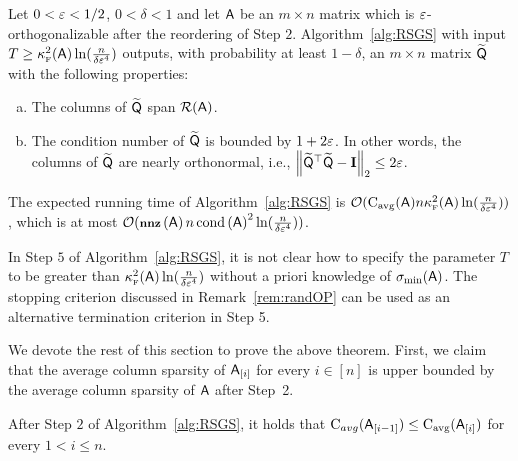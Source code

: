 %
%
%
\begin{theorem}
%
Let $0<\varepsilon< 1/2$, $0<\delta <1$ and let ${\mathsf{A} }$ be an $m\times n$ matrix which is $\varepsilon$-orthogonalizable after the reordering of Step $2$. Algorithm~\ref{alg:RSGS} with input $T\geq \kappa^2_{\textrm{\tiny F}}({\mathsf{A} }) \ln( \frac{n}{\delta\varepsilon^4})$ outputs, with probability at least $1-\delta$, an $m\times n$ matrix $\widetilde{{\mathsf{Q} }}$ with the following properties:
\begin{enumerate}[(a)]
	\item
	The columns of $\widetilde{{\mathsf{Q} }}$ span $\mathcal{R}({\mathsf{A} })$.
	\item
	The condition number of $\widetilde{{\mathsf{Q} }}$ is bounded by $1+2\varepsilon$. In other words, the columns of $\widetilde{{\mathsf{Q} }}$ are nearly orthonormal, i.e., $\left\|\widetilde{{\mathsf{Q} }}^\top \widetilde{{\mathsf{Q} }} - \mathbf{I}\right\|_2 \leq 2\varepsilon$.
\end{enumerate}
The expected running time of Algorithm~\ref{alg:RSGS} is $\mathcal{O}(\mathrm{C}_{\mathrm{avg}}({\mathsf{A} }) n \kappa^2_{\textrm{\tiny F}}({\mathsf{A} }) \ln(\frac{n}{\delta \varepsilon^4}))$, which is at most $\mathcal{O}(\operatorname{\textbf{\footnotesize nnz}}\left({\mathsf{A} }\right) n \operatorname{\mathrm{cond}}\left({\mathsf{A} }\right)^2\ln(\frac{n}{\delta \varepsilon^4}))$.
\end{theorem}
\begin{remark}
	In Step $5$ of Algorithm~\ref{alg:RSGS}, it is not clear how to specify the parameter $T$ to be greater than $\kappa^2_{\textrm{\tiny F}}({\mathsf{A} }) \ln( \frac{n}{\delta\varepsilon^4})$ without a priori knowledge of $\sigma_{\min}({\mathsf{A} })$. The stopping criterion discussed in Remark~\ref{rem:randOP} can be used as an alternative termination criterion in Step 5.
\end{remark}
We devote the rest of this section to prove the above theorem. First, we claim that the average column sparsity of ${\mathsf{A} }_{[i]}$ for every $i\in{[n]}$ is upper bounded by the average column sparsity of ${\mathsf{A} }$ after Step~2.
%
\begin{lemma}\label{lem:sparsity}
After Step $2$ of Algorithm~\ref{alg:RSGS}, it holds that $\text{C}_{avg}({\mathsf{A} }_{[i-1]}) \leq \text{C}_{\text{avg}}({\mathsf{A} }_{[i]})$ for every $1 < i \leq n $.
\end{lemma}
%
